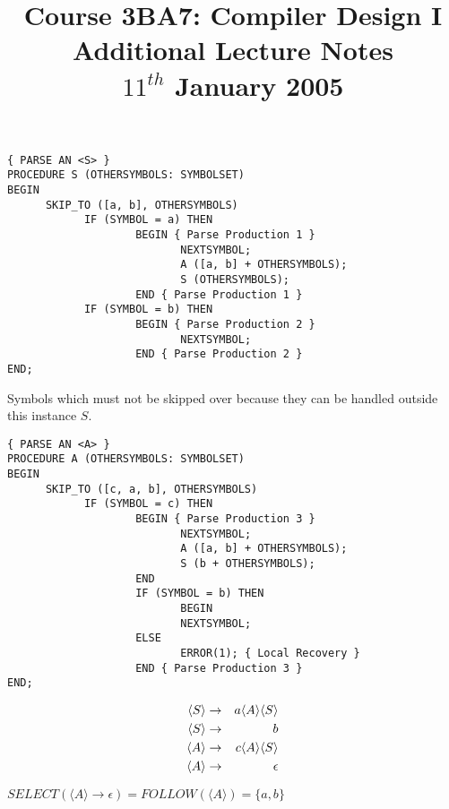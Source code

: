 \documentclass[a4paper,12pt]{article}
\newcommand{\nonterminal}[1]{\langle #1 \rangle}
\begin{document}
\title{Course 3BA7: Compiler Design I \\ Additional Lecture Notes \\	$11^{th}$ January 2005}

\maketitle

\begin{verbatim}
{ PARSE AN <S> }
PROCEDURE S (OTHERSYMBOLS: SYMBOLSET)
BEGIN
      SKIP_TO ([a, b], OTHERSYMBOLS)
            IF (SYMBOL = a) THEN
                    BEGIN { Parse Production 1 }
                           NEXTSYMBOL;
                           A ([a, b] + OTHERSYMBOLS);
                           S (OTHERSYMBOLS);
                    END { Parse Production 1 }
            IF (SYMBOL = b) THEN
                    BEGIN { Parse Production 2 }
                           NEXTSYMBOL;
                    END { Parse Production 2 }
END;
\end{verbatim}

Symbols which must not be skipped over because they can be handled
outside this instance $S$.

\begin{verbatim}
{ PARSE AN <A> }
PROCEDURE A (OTHERSYMBOLS: SYMBOLSET)
BEGIN
      SKIP_TO ([c, a, b], OTHERSYMBOLS)
            IF (SYMBOL = c) THEN
                    BEGIN { Parse Production 3 }
                           NEXTSYMBOL;
                           A ([a, b] + OTHERSYMBOLS);
                           S (b + OTHERSYMBOLS);
                    END
                    IF (SYMBOL = b) THEN
                           BEGIN
                           NEXTSYMBOL;
                    ELSE
                           ERROR(1); { Local Recovery }
                    END { Parse Production 3 }
END;
\end{verbatim}

\begin{eqnarray}
\setcounter{equation}{1}
\nonterminal{S}	&	\to	&	a \nonterminal{A} \nonterminal{S}	\\
\nonterminal{S}	&	\to	&	b 												\\
\nonterminal{A}	&	\to	&	c \nonterminal{A} \nonterminal{S}	\\
\nonterminal{A}	&	\to	&	\epsilon		
\end{eqnarray}

$SELECT(\nonterminal{A} \to \epsilon) = FOLLOW(\nonterminal{A}) = 
\{ a, b \}$
\end{document}
